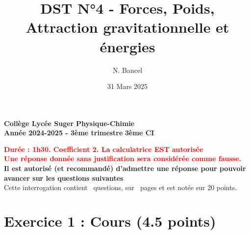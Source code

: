 \documentclass[answers]{exam}
\title{DST N°4 - Forces, Poids, Attraction gravitationnelle et énergies}
\author{N. Bancel}
\date{31 Mars 2025}
\begin{document}
\textbf{Collège Lycée Suger}
\hfill
\textbf{Physique-Chimie} \\

\textbf{Année 2024-2025 - 3ème trimestre}
\hfill
\textbf{3ème CI} \par

{\let\newpage\relax\maketitle}

\begin{center}
\textbf{\textcolor{red}{Durée : 1h30. Coefficient 2. La calculatrice EST autorisée}} \\
\textbf{\textcolor{red}{Une réponse donnée sans justification sera considérée comme fausse.}} \\
\textbf{Il est autorisé (et recommandé) d'admettre une réponse pour pouvoir avancer sur les questions suivantes} \\

Cette interrogation contient \numquestions\ questions, sur \numpages\ pages et est notée sur 20 points. 

\end{center}

\section*{Exercice 1 : Cours (4.5 points)}
\end{document}
